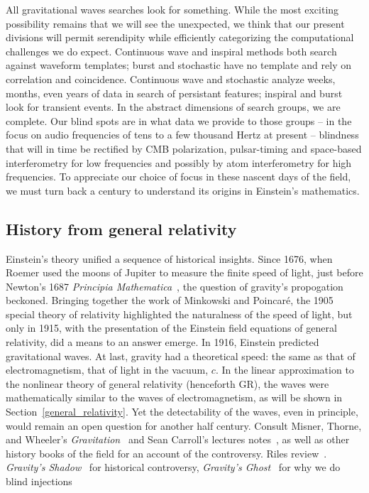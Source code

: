 All gravitational waves searches look for something. While the most exciting possibility remains that we will see the unexpected, we think that our present divisions will permit serendipity while efficiently categorizing the computational challenges we do expect. Continuous wave and inspiral methods both search against waveform templates; burst and stochastic have no template and rely on correlation and coincidence. Continuous wave and stochastic analyze weeks, months, even years of data in search of persistant features; inspiral and burst look for transient events. In the abstract dimensions of search groups, we are complete. Our blind spots are in what data we provide to those groups -- in the focus on audio frequencies of tens to a few thousand Hertz at present -- blindness that will in time be rectified by CMB polarization, pulsar-timing and space-based interferometry for low frequencies and possibly by atom interferometry for high frequencies. To appreciate our choice of focus in these nascent days of the field, we must turn back a century to understand its origins in Einstein's mathematics.

        \subsection{History from general relativity}
        \label{history_GR}

        Einstein's theory unified a sequence of historical insights. Since 1676, when Roemer used the moons of Jupiter to measure the finite speed of light, just before Newton's 1687 \textit{Principia Mathematica}~\cite{Hawking2002}, the question of gravity's propogation beckoned. 
Bringing together the work of Minkowski and Poincar\'{e}, the 1905 special theory of relativity highlighted the naturalness of the speed of light, but only in 1915, with the presentation of the Einstein field equations of general relativity, did a means to an answer emerge. 
In 1916, Einstein predicted gravitational waves. 
At last, gravity had a theoretical speed: the same as that of electromagnetism, that of light in the vacuum, $c$.
In the linear approximation to the nonlinear theory of general relativity (henceforth GR), the waves were mathematically similar to the waves of electromagnetism, as will be shown in Section~\ref{general_relativity}.
Yet the detectability of the waves, even in principle, would remain an open question for another half century. 
Consult Misner, Thorne, and Wheeler's \textit{Gravitation}~\cite{MisnerThorneWheeler} and Sean Carroll's lectures notes~\cite{Carroll1997}, as well as other history books of the field for an account of the controversy.
Riles review~\cite{Riles2013}.
\textit{Gravity's Shadow}~\cite{CollinsGravityShadow} for historical controversy,
\textit{Gravity's Ghost}~\cite{CollinsGravityGhost} for why we do blind injections

